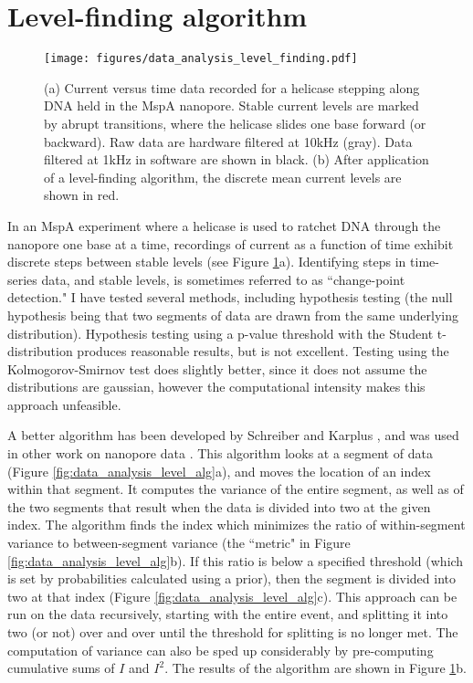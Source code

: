 \section{Level-finding algorithm}
\label{level_finding}

\begin{figure}[H]
\begin{centering}
\texttt{[image: figures/data\_analysis\_level\_finding.pdf]}
\caption[Data analysis: level-finding]{(a) Current versus time data recorded for a helicase stepping along DNA held in the MspA nanopore.  Stable current levels are marked by abrupt transitions, where the helicase slides one base forward (or backward).  Raw data are hardware filtered at 10kHz (gray).  Data filtered at 1kHz in software are shown in black.  (b) After application of a level-finding algorithm, the discrete mean current levels are shown in red.}
\label{fig:data_analysis_levels}
\end{centering}
\end{figure}

In an MspA experiment where a helicase is used to ratchet DNA through the nanopore one base at a time, recordings of current as a function of time exhibit discrete steps between stable levels (see Figure \ref{fig:data_analysis_levels}a).  Identifying steps in time-series data, and stable levels, is sometimes referred to as ``change-point detection."  I have tested several methods, including hypothesis testing (the null hypothesis being that two segments of data are drawn from the same underlying distribution).  Hypothesis testing using a p-value threshold with the Student t-distribution produces reasonable results, but is not excellent.  Testing using the Kolmogorov-Smirnov test does slightly better, since it does not assume the distributions are gaussian, however the computational intensity makes this approach unfeasible.

A better algorithm has been developed by Schreiber and Karplus \citep{Schreiber2015}, and was used in other work on nanopore data \citep{Laszlo2014}.  This algorithm looks at a segment of data (Figure \ref{fig:data_analysis_level_alg}a), and moves the location of an index within that segment.  It computes the variance of the entire segment, as well as of the two segments that result when the data is divided into two at the given index.  The algorithm finds the index which minimizes the ratio of within-segment variance to between-segment variance (the ``metric" in Figure \ref{fig:data_analysis_level_alg}b).  If this ratio is below a specified threshold (which is set by probabilities calculated using a prior), then the segment is divided into two at that index (Figure \ref{fig:data_analysis_level_alg}c).  This approach can be run on the data recursively, starting with the entire event, and splitting it into two (or not) over and over until the threshold for splitting is no longer met.  The computation of variance can also be sped up considerably by pre-computing cumulative sums of $I$ and $I^2$.  The results of the algorithm are shown in Figure \ref{fig:data_analysis_levels}b.

